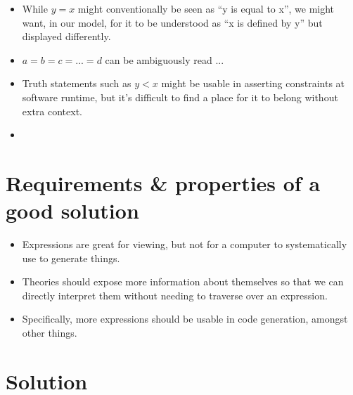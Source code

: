 \begin{itemize}
\begin{itemize}
		      \item While \(y = x\) might conventionally be seen as ``y is equal
		            to x'', we might want, in our model, for it to be understood
		            as ``x is defined by y'' but displayed differently.

		      \item \(a = b = c = ... = d\) can be ambiguously read ...

		      \item Truth statements such as \(y < x\) might be usable in
		            asserting constraints at software runtime, but it's
		            difficult to find a place for it to belong without extra
		            context.

		      \item {}

	      \end{itemize}

\end{itemize}

\section{Requirements \& properties of a good solution}

\begin{itemize}

	\item Expressions are great for viewing, but not for a computer to
	      systematically use to generate things.

	\item Theories should expose more information about themselves so that we
	      can directly interpret them without needing to traverse over an
	      expression.

	\item Specifically, more expressions should be usable in code generation,
	      amongst other things.

\end{itemize}

\section{Solution}

